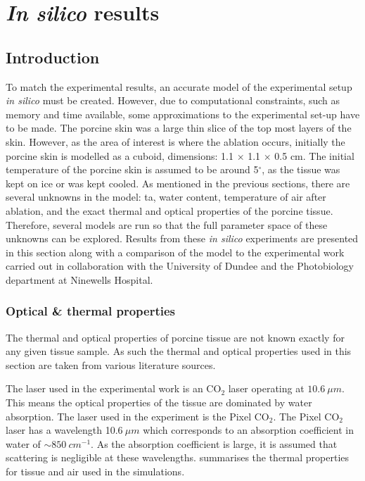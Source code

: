 


\section{\textit{In silico} results} 

\subsection{Introduction}

To match the experimental results,  an accurate model of the experimental setup \textit{in silico} must be created. However, due to computational constraints, such as memory and time available, some approximations to the experimental set-up have to be made. The porcine skin was a large thin slice of the top most layers of the skin. However, as the area of interest is where the ablation occurs, initially the porcine skin is modelled as a cuboid, dimensions:  1.1 $\times$ 1.1 $\times$ 0.5 cm. The initial temperature of the porcine skin is assumed to be around 5$^{\circ}$, as the tissue was kept on ice or was kept cooled. 
As mentioned in the previous sections, there are several unknowns in the model: \gls*{ta}, water content, temperature of air after ablation, and the exact thermal and optical properties of the porcine tissue. Therefore, several models are run so that the full parameter space of these unknowns can be explored.
Results from these \textit{in silico} experiments are presented in this section along with a comparison of the model to the experimental work carried out in collaboration with the University of Dundee and the Photobiology department at Ninewells Hospital.


\subsubsection*{Optical \& thermal properties}
\label{sec:opticalprops}
The thermal and optical properties of porcine tissue are not known exactly for any given tissue sample. As such the thermal and optical properties used in this section are taken from various literature sources.

The laser used in the experimental work is an CO$_2$ laser operating at $10.6\ \mu m$. This means the optical properties of the tissue are dominated by water absorption. The laser used in the experiment is the Pixel CO$_2$\cite{pixelco2}. The Pixel CO$_2$ laser has a wavelength 10.6$~\mu m$ which corresponds to an absorption coefficient in water of $\sim 850~cm^{-1}$. As the absorption coefficient is large, it is assumed that scattering is negligible at these wavelengths.
 summarises the thermal properties for tissue and air used in the simulations.  

